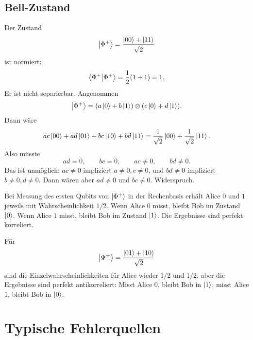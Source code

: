 \subsection{Bell-Zustand}

Der Zustand
\[
    \left|\Phi^+\right\rangle=\frac{\left|00\right\rangle+\left|11\right\rangle}{\sqrt2}
\]
ist normiert:
\[
    \left\langle\Phi^+\middle|\Phi^+\right\rangle=\frac12(1+1)=1.
\]
Er ist nicht separierbar. Angenommen
\[
    \left|\Phi^+\right\rangle=(a\left|0\right\rangle+b\left|1\right\rangle)\otimes(c\left|0\right\rangle+d\left|1\right\rangle).
\]
Dann wäre
\[
    ac\left|00\right\rangle+ad\left|01\right\rangle+bc\left|10\right\rangle+bd\left|11\right\rangle
    =\frac{1}{\sqrt2}\left|00\right\rangle+\frac{1}{\sqrt2}\left|11\right\rangle.
\]
Also müsste
\[
    ad=0,
    \qquad
    bc=0,
    \qquad
    ac\neq0,
    \qquad
    bd\neq0.
\]
Das ist unmöglich: $ac\neq0$ impliziert $a\neq0,c\neq0$, und $bd\neq0$ impliziert $b\neq0,d\neq0$. Dann wären aber $ad\neq0$ und $bc\neq0$. Widerspruch.

\begin{answerbox}
Bei Messung des ersten Qubits von $\left|\Phi^+\right\rangle$ in der Rechenbasis erhält Alice $0$ und $1$ jeweils mit Wahrscheinlichkeit $1/2$. Wenn Alice $0$ misst, bleibt Bob im Zustand $\left|0\right\rangle$. Wenn Alice $1$ misst, bleibt Bob im Zustand $\left|1\right\rangle$. Die Ergebnisse sind perfekt korreliert.
\end{answerbox}

Für
\[
    \left|\Psi^+\right\rangle=\frac{\left|01\right\rangle+\left|10\right\rangle}{\sqrt2}
\]
sind die Einzelwahrscheinlichkeiten für Alice wieder $1/2$ und $1/2$, aber die Ergebnisse sind perfekt antikorreliert: Misst Alice $0$, bleibt Bob in $\left|1\right\rangle$; misst Alice $1$, bleibt Bob in $\left|0\right\rangle$.

\section{Typische Fehlerquellen}

